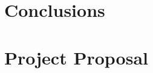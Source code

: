 \documentclass[12pt,a4paper,twoside,openright]{report}
\begin{document}
\chapter{Conclusions}



\appendix

\chapter{Project Proposal}


\end{document}
